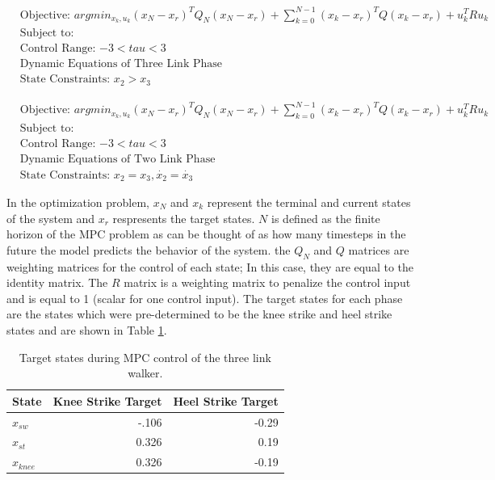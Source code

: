 \documentclass{./springer/svjour3}
\begin{document}
\begin{equation}
  \begin{aligned}
  &\text{Objective: $arg min_{x_k,u_k} (x_N - x_r)^TQ_N(x_N - x_r) + \sum_{k = 0}^{N-1} (x_k - x_r)^TQ(x_k - x_r) + u_k^TRu_k $}\\
  &\text{Subject to:}\\
  &\text{Control Range: $-3 < tau < 3$}\\
  &\text{Dynamic Equations of Three Link Phase}\\
  &\text{State Constraints: $x_2 > x_3 $}
  \end{aligned}
  \label{eq:threelinkphaseopt}
\end{equation}

\begin{equation}
  \begin{aligned}
  &\text{Objective: $arg min_{x_k,u_k} (x_N - x_r)^TQ_N(x_N - x_r) + \sum_{k = 0}^{N-1} (x_k - x_r)^TQ(x_k - x_r) + u_k^TRu_k $}\\
  &\text{Subject to:}\\
  &\text{Control Range: $-3 < tau < 3$}\\
  &\text{Dynamic Equations of Two Link Phase}\\
  &\text{State Constraints: $x_2 = x_3, \dot{x_2} = \dot{x_3}$}
  \end{aligned}
  \label{eq:twolinkphaseopt}
\end{equation}

In the optimization problem, $x_N$ and $x_k$ represent the terminal and current states of the system and $x_r$ respresents the target states.
$N$ is defined as the finite horizon of the MPC problem as can be thought of as how many timesteps in the future the model predicts the behavior of the system.
the $Q_N$ and $Q$ matrices are weighting matrices for the control of each state; In this case, they are equal to the identity matrix.
The $R$ matrix is a weighting matrix to penalize the control input and is equal to 1 (scalar for one control input).
The target states for each phase are the states which were pre-determined to be the knee strike and heel strike states and are shown in Table \ref{tab:threelegterm}.

\begin{table}[h]
  \centering
  \caption{Target states during MPC control of the three link walker.}
  \begin{tabular}{lrr}
  \toprule
  State & Knee Strike Target & Heel Strike Target\\
  \midrule
  $x_{sw}$ & -.106  & -0.29\\
  $x_{st}$ & 0.326 & 0.19\\
  $x_{knee}$ & 0.326 & -0.19\\
  \end{tabular}
  \label{tab:threelegterm}
\end{table}
\end{document}
